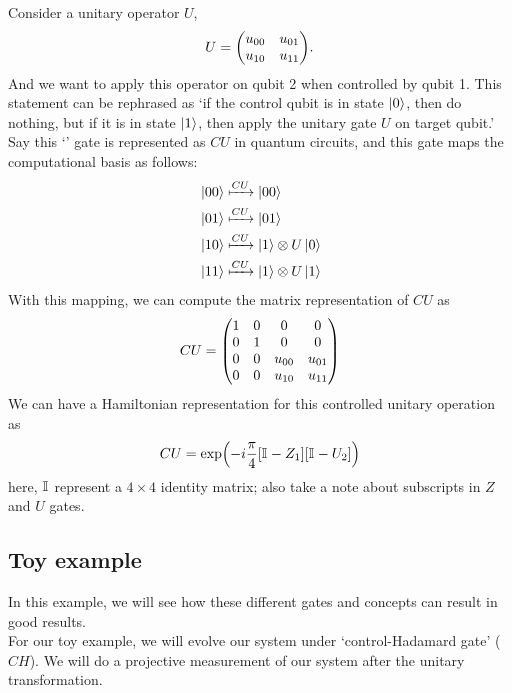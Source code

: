 \documentclass[11pt, oneside, listof=totoc]{scrbook}
\renewcommand{\u}{0}
\renewcommand{\d}{1}
\newcommand{\ku}{\ket{0}}
\newcommand{\kd}{\ket{1}}
\begin{document}
\noindent Consider a unitary operator \(U\),
\[
    U = \mqty(u_{00} & u_{01} \\ u_{10} & u_{11}).
\]
And we want to apply this operator on qubit 2 when controlled by qubit 1. This statement can be rephrased as `if the control qubit is in state \(\ku\), then do nothing, but if it is in state \(\kd\), then apply the unitary gate \(U\) on target qubit.' Say this `' gate is represented as \(CU\) in quantum circuits, and this gate maps the computational basis as follows:
\begin{align*}
     & \ket{\u \u} \xmapsto{CU} \ket{\u \u}      \\
     & \ket{\u \d} \xmapsto{CU} \ket{\u \d}      \\
     & \ket{\d \u} \xmapsto{CU} \kd \otimes U\ku \\
     & \ket{\d \d} \xmapsto{CU} \kd \otimes U\kd \\
\end{align*}
With this mapping, we can compute the matrix representation of \(CU\) as
\begin{equation}
    CU = \mqty(
    1 & 0 & 0 & 0 \\
    0 & 1 & 0 & 0 \\
    0 & 0 & u_{00} & u_{01} \\
    0 & 0 & u_{10} & u_{11}
    )
\end{equation}
We can have a Hamiltonian representation for this controlled unitary operation as
\begin{equation}\label{eq:CU-exp}
    CU = \exp(- i \frac{\pi}{4} [\mathbb{I}_{} - Z_1][\mathbb{I}_{} - U_2])
\end{equation}
here, \(\mathbb{I}_{}\) represent a \(4 \times 4\) identity matrix; also take a note about subscripts in \(Z\) and \(U\) gates.

\subsection{Toy example}

In this example, we will see how these different gates and concepts can result in good results.\hfill \\

\noindent For our toy example, we will evolve our system under `control-Hadamard gate' ($CH$). We will do a projective measurement of our system after the unitary transformation.
\end{document}
